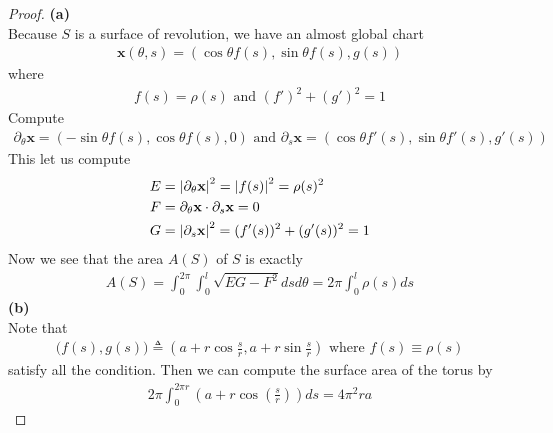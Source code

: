 \documentclass{report}
\begin{document}
\begin{proof}
\textbf{(a)}\\

Because $S$ is a surface of revolution, we have an almost global chart 
\begin{align*}
\textbf{x}(\theta,s)=(\cos \theta f(s),\sin \theta f(s),g(s))
\end{align*}
where 
\begin{align*}
f(s)=\rho(s)\text{ and }(f')^2+(g')^2=1
\end{align*}
Compute 
\begin{align*}
\partial_\theta \textbf{x}=(-\sin \theta f(s), \cos \theta f(s),0)\text{ and }\partial_s \textbf{x}=(\cos \theta f'(s),\sin \theta f'(s),g'(s))
\end{align*}
This let us compute 
\begin{align*}
E&=\left|\partial _\theta \textbf{x}\right|^2=\left|f(s)\right|^2=\rho(s)^2 \\
F&=\partial_\theta \textbf{x}\cdot \partial_ s \textbf{x}=0 \\
G&=\left|\partial_s \textbf{x}\right|^2 = (f'(s))^2 + (g'(s))^2=1
\end{align*}
Now we see that the area $A(S)$ of $S$ is exactly 
\begin{align*}
A(S)=\int_0^{2\pi}\int_0^l \sqrt{EG-F^2}dsd\theta =2\pi \int_0^l \rho (s) ds
\end{align*}
\textbf{(b)}\\
Note that 
\begin{align*}
  \big(f(s),g(s) \big)\triangleq (a+r \cos \frac{s}{r},a+ r \sin \frac{s}{r})\text{ where }f(s)\equiv \rho(s)
\end{align*}
satisfy all the condition. Then we can compute the surface area of the torus by
\begin{align*}
2\pi \int_0^{2\pi r} (a+ r \cos (\frac{s}{r}))ds= 4\pi^2 ra
\end{align*}

\end{proof}
\end{document}
